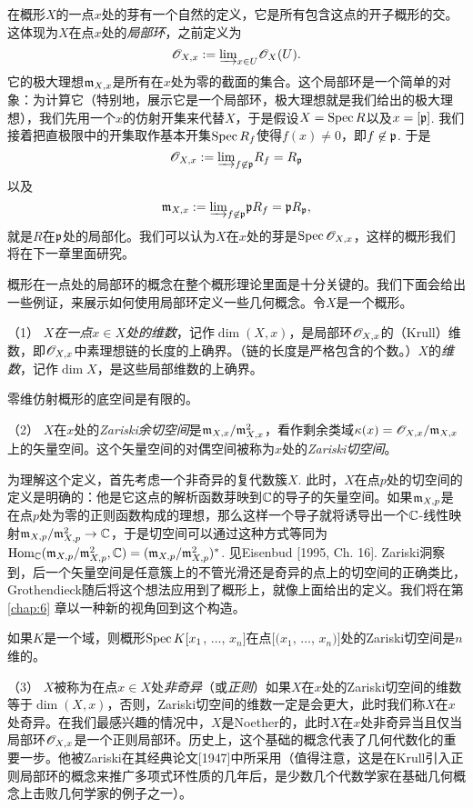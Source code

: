 在概形$X$的一点$x$处的芽有一个自然的定义，它是所有包含这点的开子概形的交。这体现为$X$在点$x$处的\textit{局部环}，之前定义为
\[
	\mathscr{O}_{X,x}:={\varinjlim}_{x\in U}\mathscr{O}_X(U).
\]
它的极大理想$\mathfrak{m}_{X,x}$是所有在$x$处为零的截面的集合。这个局部环是一个简单的对象：为计算它（特别地，展示它是一个局部环，极大理想就是我们给出的极大理想），我们先用一个$x$的仿射开集来代替$X$，于是假设$X=\operatorname{Spec} R$以及$x=[\mathfrak{p}]$. 我们接着把直极限中的开集取作基本开集$\operatorname{Spec} R_f$使得$f(x)\neq 0$，即$f\not\in \mathfrak{p}$. 于是
\[
	\mathscr{O}_{X,x}:={\varinjlim}_{f\not\in \mathfrak{p}}R_f=R_{\mathfrak{p}}
\]
以及
\[
	\mathfrak{m}_{X,x}:={\varinjlim}_{f\not\in \mathfrak{p}}\mathfrak{p} R_f=\mathfrak{p} R_{\mathfrak{p}},
\]
就是$R$在$\mathfrak{p}$处的局部化。我们可以认为$X$在$x$处的芽是$\operatorname{Spec} \mathscr{O}_{X,x}$，这样的概形我们将在下一章里面研究。

概形在一点处的局部环的概念在整个概形理论里面是十分关键的。我们下面会给出一些例证，来展示如何使用局部环定义一些几何概念。令$X$是一个概形。

\vspace{0.5em}
（1） \textit{$X$在一点$x\in X$处的维数}，记作$\dim(X,x)$，是局部环$\mathscr{O}_{X,x}$的（Krull）维数，即$\mathscr{O}_{X,x}$中素理想链的长度的上确界。（链的长度是严格包含的个数。）$X$的\textit{维数}，记作$\dim X$，是这些局部维数的上确界。

\begin{exe}
	零维仿射概形的底空间是有限的。
\end{exe}

（2） $X$在$x$处的\textit{Zariski余切空间}是$\mathfrak{m}_{X,x}/\mathfrak{m}_{X,x}^2$，看作剩余类域$\kappa(x)=\mathscr{O}_{X,x}/\mathfrak{m}_{X,x}$上的矢量空间。这个矢量空间的对偶空间被称为$x$处的\textit{Zariski切空间}。

为理解这个定义，首先考虑一个非奇异的复代数簇$X$. 此时，$X$在点$p$处的切空间的定义是明确的：他是它这点的解析函数芽映到$\mathbb{C}$的导子的矢量空间。如果$\mathfrak{m}_{X,p}$是在点$p$处为零的正则函数构成的理想，那么这样一个导子就将诱导出一个$\mathbb{C}$-线性映射$\mathfrak{m}_{X,p}/\mathfrak{m}_{X,p}^2\to \mathbb{C}$，于是切空间可以通过这种方式等同为$\operatorname{Hom}_{\mathbb{C}}(\mathfrak{m}_{X,p}/\mathfrak{m}_{X,p}^2,\mathbb{C})=(\mathfrak{m}_{X,p}/\mathfrak{m}_{X,p}^2)^*$. 见Eisenbud [1995, Ch. 16]. Zariski洞察到，后一个矢量空间是任意簇上的不管光滑还是奇异的点上的切空间的正确类比，Grothendieck随后将这个想法应用到了概形上，就像上面给出的定义。我们将在第 \ref{chap:6} 章以一种新的视角回到这个构造。

\begin{exe}
如果$K$是一个域，则概形$\operatorname{Spec} K[x_1$, $\dots$, $x_n]$在点$[(x_1$, $\dots$, $x_n)]$处的Zariski切空间是$n$维的。
\end{exe}

（3） $X$被称为在点$x\in X$处\textit{非奇异}（或\textit{正则}）如果$X$在$x$处的Zariski切空间的维数等于$\dim(X,x)$，否则，Zariski切空间的维数一定是会更大，此时我们称$X$在$x$处奇异。在我们最感兴趣的情况中，$X$是Noether的，此时$X$在$x$处非奇异当且仅当局部环$\mathscr{O}_{X,x}$是一个正则局部环。历史上，这个基础的概念代表了几何代数化的重要一步。他被Zariski在其经典论文[1947]中所采用（值得注意，这是在Krull引入正则局部环的概念来推广多项式环性质的几年后，是少数几个代数学家在基础几何概念上击败几何学家的例子之一）。

